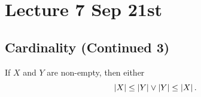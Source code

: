 \documentclass[notoc,notitlepage]{tufte-book}
\begin{document}


\chapter{Lecture 7 Sep 21st}%
\label{chp:lecture_7_sep_21st}

\section{Cardinality (Continued 3)}%
\label{sec:cardinality_continued_3}

\begin{thm}\label{thm:comparability_of_cardinals}
  If $X$ and $Y$ are non-empty, then either
  \begin{equation*}
    \left|X\right| \leq \left|Y\right| \lor \left|Y\right| \leq \left|X\right|.
  \end{equation*}
\end{thm}
\end{document}
